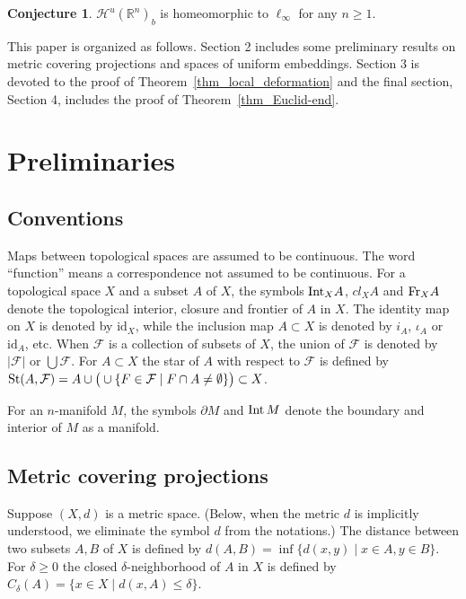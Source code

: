 \documentclass[11pt, fleqn]{amsart}
\theoremstyle{definition}
\newtheorem{conjecture}{Conjecture}[section]
\newcommand{\cal}{\mathcal}
\newcommand{\id}{\mathrm{id}}
\newcommand{\F}{\mathcal F}
\newcommand{\IR}{\mathbb R}
\newcommand{\IN}{\mathbb N}
\newcommand{\IZ}{\mathbb Z}
\begin{document}
\begin{conjecture} ${\cal H}^u(\IR^n)_b$ is homeomorphic to $\ell_\infty$ for any $n \geq 1$.  
\end{conjecture} 

This paper is organized as follows. Section 2 includes some preliminary results on 
metric covering projections and spaces of uniform embeddings. 
Section 3 is devoted to the proof of Theorem~\ref{thm_local_deformation} and 
the final section, Section 4, includes the proof of Theorem~\ref{thm_Euclid-end}. 

\section{Preliminaries}
\subsection{Conventions} \mbox{} 


Maps between topological spaces are assumed to be continuous. 
The word ``function'' means a correspondence not assumed to be continuous. 
For a topological space $X$ and a subset $A$ of $X$, 
the symbols ${\rm Int}_X A$,  $cl_X A$ and ${\rm Fr}_X A$ denote the topological 
interior, closure and frontier of $A$ in $X$. 
The identity map on $X$ is denoted by $\id_X$, while the inclusion map $A \subset X$ is denoted by $i_A$, $\iota_A$ or $\id_A$, etc. 
When ${\cal F}$ is a collection of subsets of $X$, 
the union of ${\cal F}$ is denoted by $|\F|$ or $\bigcup \F$.
For $A \subset X$ 
the star of $A$ with respect to $\cal{F}$ is defined by ${\rm St}(A, \cal{F}) = A \cup \big( \cup \{ F \in {\cal F} \mid F \cap A \neq  \emptyset \}\big) \subset X$. 

For an $n$-manifold $M$, 
the symbols $\partial M$ and ${\rm Int}\,M$ denote the boundary and interior of $M$ as a manifold. 

\subsection{Metric covering projections} \mbox{} 

Suppose $(X, d)$ is a metric space. 
(Below, when the metric $d$ is implicitly understood, we eliminate the symbol $d$ from the notations.)  
The distance between two subsets $A, B$ of $X$ is defined by  
$d(A, B) = \inf \{ d(x, y) \mid x \in A, y \in B \}$. 
For $\delta \geq 0$ 
the closed $\delta$-neighborhood of $A$ in $X$ is defined by 
$C_\delta(A) = \{ x \in X \mid d(x, A) \leq \delta \}$. 
\end{document}
